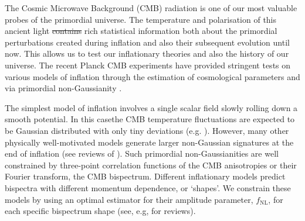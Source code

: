 \documentclass[a4paper,12pt,times,custombib,print,index]{Classes/PhDThesisPSnPDF} %
\providecommand{\DIFadd}[1]{{\protect\color{blue}\uwave{#1}}} %
\providecommand{\DIFdel}[1]{{\protect\color{red}\sout{#1}}}                      %
\providecommand{\DIFaddbegin}{} %
\providecommand{\DIFaddend}{} %
\providecommand{\DIFdelbegin}{} %
\providecommand{\DIFdelend}{} %
\newcommand{\DIFscaledelfig}{0.5}
\newlength{\DIFdelgraphicswidth} %
\newlength{\DIFdelgraphicsheight} %
\newcommand{\DIFaddincludegraphics}[2][]{{\color{blue}\fbox{\DIFOincludegraphics[#1]{#2}}}} %
\newcommand{\DIFdelincludegraphics}[2][]{%
\sbox{\DIFdelgraphicsbox}{\DIFOincludegraphics[#1]{#2}}%
\settoboxwidth{\DIFdelgraphicswidth}{\DIFdelgraphicsbox} %
\settoboxtotalheight{\DIFdelgraphicsheight}{\DIFdelgraphicsbox} %
\scalebox{\DIFscaledelfig}{%
\parbox[b]{\DIFdelgraphicswidth}{\usebox{\DIFdelgraphicsbox}\\[-\baselineskip] \rule{\DIFdelgraphicswidth}{0em}}\llap{\resizebox{\DIFdelgraphicswidth}{\DIFdelgraphicsheight}{%
\setlength{\unitlength}{\DIFdelgraphicswidth}%
\begin{picture}(1,1)%
\thicklines\linethickness{2pt} %
{\color[rgb]{1,0,0}\put(0,0){\framebox(1,1){}}}%
{\color[rgb]{1,0,0}\put(0,0){\line( 1,1){1}}}%
{\color[rgb]{1,0,0}\put(0,1){\line(1,-1){1}}}%
\end{picture}%
}\hspace*{3pt}}} %
} %
\DeclareRobustCommand{\DIFaddbegin}{\DIFOaddbegin \let\includegraphics\DIFaddincludegraphics} %
\DeclareRobustCommand{\DIFaddend}{\DIFOaddend \let\includegraphics\DIFOincludegraphics} %
\DeclareRobustCommand{\DIFdelbegin}{\DIFOdelbegin \let\includegraphics\DIFdelincludegraphics} %
\DeclareRobustCommand{\DIFdelend}{\DIFOaddend \let\includegraphics\DIFOincludegraphics} %
\begin{document}

The Cosmic Microwave Background (CMB) radiation is one of our most valuable probes of the primordial universe. The temperature and polarisation of this ancient light \DIFdelbegin \DIFdel{contains }\DIFdelend \DIFaddbegin \DIFadd{contain }\DIFaddend rich statistical information both about the primordial perturbations created during inflation and also their subsequent evolution until now.  This allows us to test our inflationary theories and also the history of our universe. The recent Planck CMB experiments have provided stringent tests on various models of inflation through the estimation of cosmological parameters and via primordial non-Gaussianity \cite{PlanckCollaboration2015,PlanckCollaboration2018}.

The simplest model of inflation involves a single scalar field slowly rolling down a smooth potential. In this case\DIFaddbegin \DIFadd{, }\DIFaddend the CMB temperature fluctuations are expected to be Gaussian distributed with only tiny deviations (e.g. \cite{Maldacena2013}). However, many other physically well-motivated models generate larger non-Gaussian signatures at the end of inflation (see reviews of \cite{Chen2010review}). Such primordial non-Gaussianities are well constrained by three-point correlation functions of the CMB anisotropies or their Fourier transform, the CMB bispectrum. Different inflationary models predict bispectra with different momentum dependence, or `shapes'. We constrain these models by using an optimal estimator for their amplitude parameter,  $f_\text{NL}$,  for each specific bispectrum shape (see, e.g, \cite{Komatsu2010,Liguori2010} for reviews).
\end{document}
